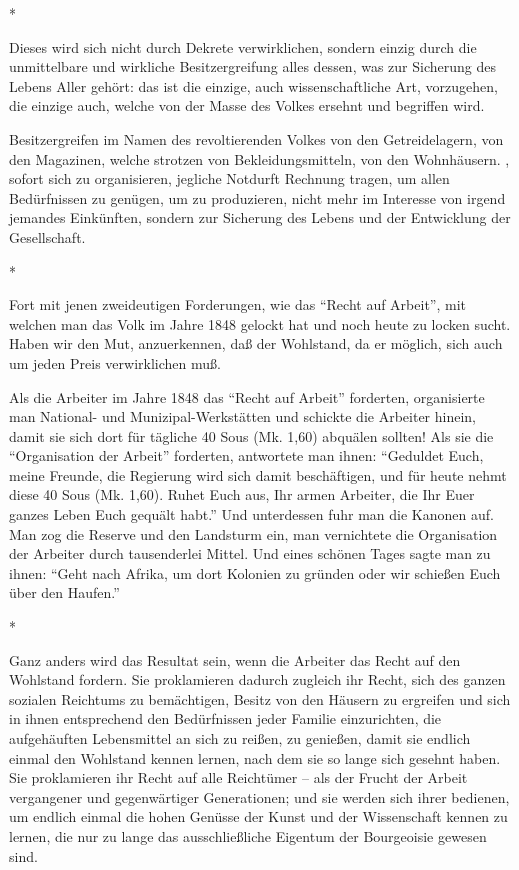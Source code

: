 \documentclass{scrbook}
\begin{document}
\begin{center}*\end{center}

Dieses wird sich nicht durch Dekrete verwirklichen, sondern einzig durch die unmittelbare und wirkliche Besitzergreifung alles dessen, was zur Sicherung des Lebens Aller gehört: das ist die einzige, auch wissenschaftliche Art, vorzugehen, die einzige auch, welche von der Masse des Volkes ersehnt und begriffen wird.

Besitzergreifen im Namen des revoltierenden Volkes von den Getreidelagern, von den Magazinen, welche strotzen von Bekleidungsmitteln, von den Wohnhäusern. , sofort sich zu organisieren, jegliche Notdurft Rechnung tragen, um allen Bedürfnissen zu genügen, um zu produzieren, nicht mehr im Interesse von irgend jemandes Einkünften, sondern zur Sicherung des Lebens und der Entwicklung der Gesellschaft.

\begin{center}*\end{center}

Fort mit jenen zweideutigen Forderungen, wie das ``Recht auf Arbeit'', mit welchen man das Volk im Jahre 1848 gelockt hat und noch heute zu locken sucht. Haben wir den Mut, anzuerkennen, daß der Wohlstand, da er möglich, sich auch um jeden Preis verwirklichen muß.

Als die Arbeiter im Jahre 1848 das ``Recht auf Arbeit'' forderten, organisierte man National- und Munizipal-Werkstätten und schickte die Arbeiter hinein, damit sie sich dort für tägliche 40 Sous (Mk. 1,60) abquälen sollten! Als sie die ``Organisation der Arbeit'' forderten, antwortete man ihnen: ``Geduldet Euch, meine Freunde, die Regierung wird sich damit beschäftigen, und für heute nehmt diese 40 Sous (Mk. 1,60). Ruhet Euch aus, Ihr armen Arbeiter, die Ihr Euer ganzes Leben Euch gequält habt.'' Und unterdessen fuhr man die Kanonen auf. Man zog die Reserve und den Landsturm ein, man vernichtete die Organisation der Arbeiter durch tausenderlei Mittel. Und eines schönen Tages sagte man zu ihnen: ``Geht nach Afrika, um dort Kolonien zu gründen oder wir schießen Euch über den Haufen.''

\begin{center}*\end{center}

Ganz anders wird das Resultat sein, wenn die Arbeiter das Recht auf den Wohlstand fordern. Sie proklamieren dadurch zugleich ihr Recht, sich des ganzen sozialen Reichtums zu bemächtigen, Besitz von den Häusern zu ergreifen und sich in ihnen entsprechend den Bedürfnissen jeder Familie einzurichten, die aufgehäuften Lebensmittel an sich zu reißen, zu genießen, damit sie endlich einmal den Wohlstand kennen lernen, nach dem sie so lange sich gesehnt haben. Sie proklamieren ihr Recht auf alle Reichtümer – als der Frucht der Arbeit vergangener und gegenwärtiger Generationen; und sie werden sich ihrer bedienen, um endlich einmal die hohen Genüsse der Kunst und der Wissenschaft kennen zu lernen, die nur zu lange das ausschließliche Eigentum der Bourgeoisie gewesen sind.
\end{document}
